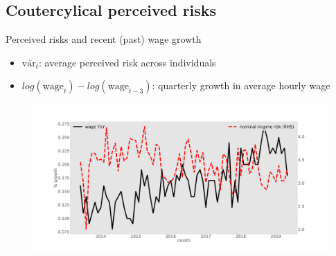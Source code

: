 \documentclass{beamer}
\begin{document}
\subsection{Coutercylical perceived risks}

\begin{frame}{Perceived risks and recent (past) wage growth}
	\begin{itemize}
		\item $\overline{\text{var}_{t}} $: average perceived risk across individuals
		\item  $log(\text{wage}_t) - log(\text{wage}_{t-3})$: quarterly growth in average hourly wage
	\end{itemize}
	\begin{figure}
		\centering
		\label{ts_var}
		\includegraphics[width=\textwidth]{figures/tsMeanvar_he.jpg}
	\end{figure}
\end{frame}


\end{document}
